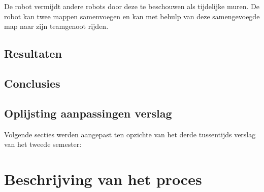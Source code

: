 \documentclass[eind]{penoverslag}
\begin{document}
{De robot vermijdt andere robots door deze te beschouwen als tijdelijke muren. De robot kan twee mappen samenvoegen en kan met behulp van deze samengevoegde map naar zijn teamgenoot rijden.

\subsection{Resultaten}
\label{Assec:result3}

\subsection{Conclusies}
\label{Assec:conc3}

\subsection{Oplijsting aanpassingen verslag}
\label{Assec:aanp3}
Volgende secties werden aangepast ten opzichte van het derde tussentijds verslag van het tweede semester:

\begin{itemize}
\end{itemize}


\section{Beschrijving van het proces}
\label{Assec:beschrijvingProces}

}
\end{document}
